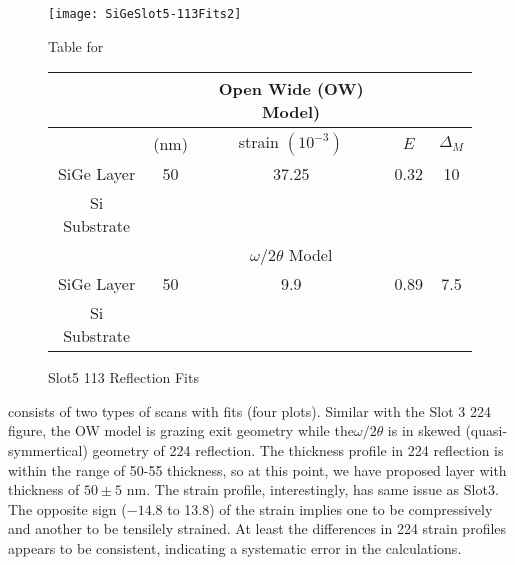 \begin{figure}[h]%
\caption{Slot5 113 Reflection Fits}
\label{Slot5-113}
\begin{minipage}{0.85\linewidth}
\texttt{[image: SiGeSlot5-113Fits2]}
\end{minipage}
\begin{minipage}{\linewidth}
\centering
\vspace{10pt}
Table for \\
\vspace{5pt}
\begin{tabular}{c|cccc}
			& 	&Open Wide (OW) Model)	 \\
\hline
			&	(nm)	&	strain	 $(10^{-3})$&	$E$ &  $\Delta_M$\\
\hline
SiGe Layer		&  	50	&      37.25	 & 0.32& 10	\\
Si Substrate		&	\textemdash & \textemdash&\textemdash\ &\textemdash	\\
\hline
			& &$\omega/2\theta$ Model \\
\hline
SiGe Layer		&	50	&9.9	& 0.89	& 7.5	\\
Si Substrate		&	\textemdash & \textemdash&\textemdash\ &\textemdash
\end{tabular}
\end{minipage}
\end{figure}

 consists of two types of scans with fits (four plots).  Similar with the Slot 3 224 figure, the OW model is grazing exit geometry while the$\omega/2\theta$ is in skewed (quasi-symmertical) geometry of 224 reflection.  The thickness profile in 224 reflection is within the range of 50-55 thickness, so at this point, we have proposed layer with thickness of $50\pm5$ nm.  The strain profile, interestingly, has same issue as Slot3.  The opposite sign ($-14.8$ to 13.8) of the strain implies one to be compressively and another to be tensilely strained.  At least the differences in 224 strain profiles appears to be consistent, indicating a systematic error in the calculations. 


